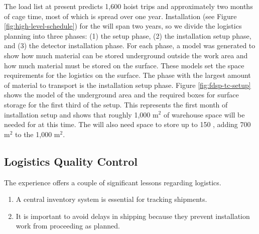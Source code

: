 The load list at present predicts 1,600 hoist trips and approximately two  months of cage time, most of which is spread over one year. Installation %
(see Figure \ref{fig:high-level-schedule}) for the  %
will span two years, so we divide the logistics planning into three  %
phases: %
(1) the  setup phase, (2) the installation setup phase, and (3) the detector installation phase. For each phase, a model was generated to show how much material can be stored underground outside the work area and how much material must be stored on the surface. These models set the space requirements for the logistics on the surface. The phase with the largest amount of material to transport is the installation setup phase.  Figure \ref{fig:fdsp-tc-setup} shows the model of the underground area and the required boxes for surface storage for the first third of the setup. This represents the first month of installation setup and shows that roughly 1,000 m$^2$ of warehouse space will be needed for  at this time.  The %
 will also need space to store up to 150 , %
adding %
700 m$^2$ to the 1,000 m$^2$. %


\subsection{Logistics Quality Control}
\label{sec:fdsp-tc-log-qaqc}


The  experience offers a couple of significant lessons regarding logistics.

\begin{enumerate}
\item A central inventory system is essential for tracking  shipments.
\item It is important to avoid delays in shipping because they prevent installation work from  proceeding as planned. 
\end{enumerate}

